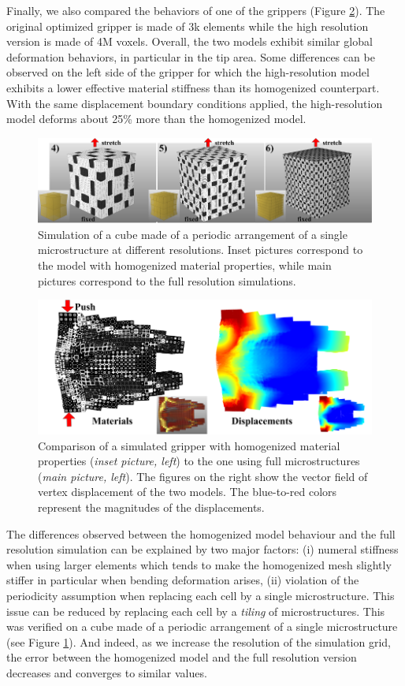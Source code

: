 Finally, we also compared the behaviors of one of the grippers (Figure \ref{fig:gripper_validate}). The original optimized gripper is made of 3k elements while the high resolution version is made of 4M voxels.
Overall, the two models exhibit similar global deformation behaviors, in particular in the tip area. Some differences can be observed on the left side of the gripper for which the high-resolution model exhibits a lower effective material stiffness than its homogenized counterpart. With the same displacement boundary conditions applied, the high-resolution model deforms about 25\% more than the homogenized model.
\begin{figure}
	\centering
	\includegraphics[width=.8\linewidth]{images/hom_cube_peri.png}	
	\caption{Simulation of a cube made of a periodic arrangement of a single microstructure at different resolutions. Inset pictures correspond to the model with homogenized material properties, while main pictures correspond to the full resolution simulations.}
	\label{fig:hom_cube_1}
\end{figure}
\begin{figure}
	\centering
	\includegraphics[width=.6\linewidth]{images/gripper_cmp.png}	
	\caption{Comparison of a simulated gripper with homogenized material properties (\emph{inset picture, left}) to the one using full microstructures (\emph{main picture, left}). The figures on the right show the vector field of vertex displacement of the two models. The blue-to-red colors represent the magnitudes of the displacements.}
		\label{fig:gripper_validate}
\end{figure}	
The differences observed between the homogenized model behaviour and the full resolution simulation can be explained by two major factors: (i) numeral stiffness when using larger elements which tends to make the homogenized mesh slightly stiffer in particular when bending deformation arises, (ii) violation of the periodicity assumption when replacing each cell by a single microstructure. This issue can be reduced by replacing each cell by a {\it tiling} of microstructures. This was verified on a cube made of a periodic arrangement of a single microstructure (see Figure \ref{fig:hom_cube_1}). And indeed, as we increase the resolution of the simulation grid, the error between the homogenized model and the full resolution version decreases and converges to similar values.
